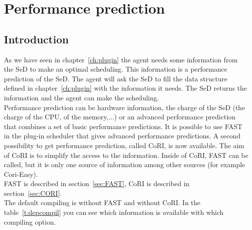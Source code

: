 
\chapter{Performance prediction}
\label{chapter:performance}
\section{Introduction}

As we have seen in chapter~\ref{ch:plugin} the agent needs some
information from the SeD to make an optimal scheduling. This
information is a performance prediction of the SeD. The agent will
ask the SeD to fill the data structure defined in
chapter~\ref{ch:plugin} with the information it needs. The SeD returns
the information and the agent can make the scheduling. \\
Performance prediction can be hardware information, the charge of
the SeD (the charge of the CPU, of the memory,...) or an advanced
performance prediction that combines a set of basic performance
predictions. It is possible to use
FAST in the plug-in scheduler that gives advanced performance predictions. A
second possibility to get performance prediction, called CoRI, is now available.
 The aim of CoRI is to simplify
the access to the information. Inside of CoRI, FAST can be called,
but it is only one source of information among other sources (for
example Cori-Easy). \\
 FAST is described in section~\ref{sec:FAST}, CoRI is
described in section~\ref{sec:CORI}.\\
The default compiling is without FAST and
without CoRI. In the table~\ref{t:depcompil} you can see which
information is available with which compiling option.

